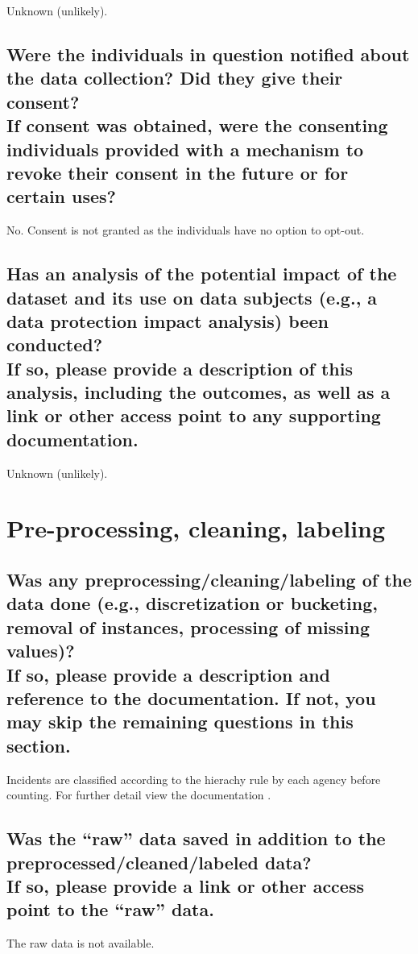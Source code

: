 \documentclass[letterpaper, 10 pt, conference]{ieeeconf}  %
\newcommand{\subtitle}[1]{{\\ \small \normalfont \color{purple} #1}}
\begin{document}
Unknown (unlikely). 

\subsection{Were the individuals in question notified about the data collection? Did they give their consent? \subtitle{If consent was obtained, were the consenting individuals provided with a mechanism to revoke their consent in the future or for certain uses?}}


No. Consent is not granted as the individuals have no option to opt-out. 

\subsection{Has an analysis of the potential impact of the dataset and its use on data subjects (e.g., a data protection impact analysis) been conducted? \subtitle{If so, please provide a description of this analysis, including the outcomes, as well as a link or other access point to any supporting documentation.}}

Unknown (unlikely). 


\section{Pre-processing, cleaning, labeling}

\subsection{Was any preprocessing/cleaning/labeling of the data done (e.g., discretization or bucketing, removal of instances, processing of missing values)? \subtitle{If so, please provide a description and reference to the documentation. If not, you may skip the remaining questions in this section.}}

Incidents are classified according to the hierachy rule by each agency before counting. For further detail view the documentation \cite{srs_manual}.

\subsection{Was the “raw” data saved in addition to the preprocessed/cleaned/labeled data? \subtitle{If so, please provide a link or other access point to the “raw” data. }}

The raw data is not available. 
\end{document}
